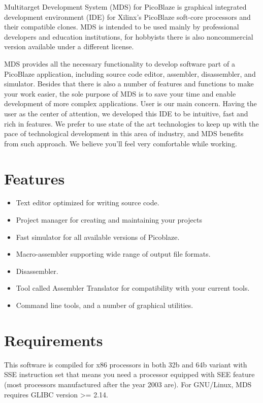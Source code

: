 Multitarget Development System (MDS) for PicoBlaze is graphical integrated development environment (IDE) for Xilinx's PicoBlaze soft-core processors and their compatible clones. MDS is intended to be used mainly by professional developers and education institutions, for hobbyists there is also noncommercial version available under a different license.

MDS provides all the necessary functionality to develop software part of a PicoBlaze application, including source code editor, assembler, disassembler, and simulator. Besides that there is also a number of features and functions to make your work easier, the sole purpose of MDS is to save your time and enable development of more complex applications. User is our main concern. Having the user as the center of attention, we developed this IDE to be intuitive, fast and rich in features. We prefer to use state of the art technologies to keep up with the pace of technological development in this area of industry, and MDS benefits from such approach. We believe you’ll feel very comfortable while working.

\section{Features}
    \begin{itemize}
        \item Text editor optimized for writing source code.
        \item Project manager for creating and maintaining your projects
        \item Fast simulator for all available versions of Picoblaze.
        \item Macro-assembler supporting wide range of output file formats.
        \item Disassembler.
        \item Tool called Assembler Translator for compatibility with your current tools.
        \item Command line tools, and a number of graphical utilities.
    \end{itemize}

\section{Requirements}
    This software is compiled for x86 processors in both 32b and 64b variant with SSE instruction set that means you
    need a processor equipped with SEE feature (most processors manufactured after the year 2003 are). For GNU/Linux,
    MDS requires GLIBC version >= 2.14.

